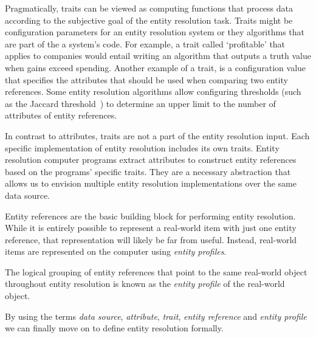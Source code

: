 Pragmatically, traits can be viewed as computing functions that process data
according to the subjective goal of the entity resolution task.
Traits might be configuration parameters for an entity resolution system or they
algorithms that are part of the a system's code.
For example, a trait called `profitable' that applies to companies would entail
writing an algorithm that outputs a truth value when gains exceed spending.
Another example of a trait, is a configuration value that specifies the
attributes that should be used when comparing two entity references.
Some entity resolution algorithms allow configuring thresholds (such as the
Jaccard threshold~\cite{jaccard1912}) to determine an upper limit to the number
of attributes of entity references.

In contrast to attributes, traits are not a part of the entity resolution input.
Each specific implementation of entity resolution includes its own traits.
Entity resolution computer programs extract attributes to construct entity
references based on the programs' specific traits.
They are a necessary abstraction that allows us to envision multiple entity
resolution implementations over the same data source.

Entity references are the basic building block for performing entity resolution.
While it is entirely possible to represent a real-world item with just one
entity reference, that representation will likely be far from useful.
Instead, real-world items are represented on the computer using \textit{entity
profiles}.

\begin{defn}
    The logical grouping of entity references that point to the same real-world
    object throughout entity resolution is known as the \textit{entity profile}
    of the real-world object.
\end{defn}

By using the terms \textit{data source}, \textit{attribute},
\textit{trait}, \textit{entity reference} and \textit{entity profile} we can
finally move on to define entity resolution formally.
